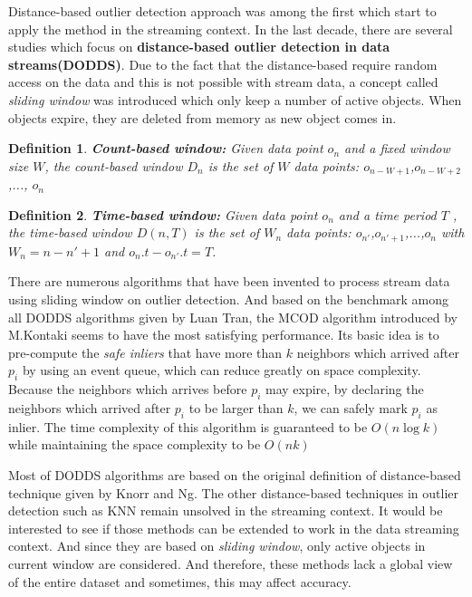 \documentclass[11pt]{article}       %
\newtheorem{definition}{Definition}
\begin{document}
Distance-based outlier detection approach was among the first which start to apply the method in the streaming context. In the last decade, there are several studies which focus on \textbf{distance-based outlier detection in data streams(DODDS)}. Due to the fact that the distance-based require random access on the data and this is not possible with stream data, a concept called \textit{sliding window} was introduced which only keep a number of active objects. When objects expire, they are deleted from memory as new object comes in.  

\begin{definition}
 \textbf{Count-based window:} Given data point $o_{n}$ and a fixed window size $W$, the count-based window $D_{n}$ is the set of $W$ data points: $o_{n - W+1}$,$o_{n -W+2}$,..., $o_{n}$
\end{definition}

\begin{definition}
 \textbf{Time-based window:} Given data point $o_{n}$ and a time period $T$ , the time-based window $D(n, T)$ is the set of $W_{n}$ data points: $o_{n'}$,$o_{n'+1}$,...,$o_{n}$ with $W_{n} = n-n' +1$ and $o_{n}.t-o_{n'}.t = T$.
\end{definition}

There are numerous algorithms that have been invented to process stream data using sliding window on outlier detection. And based on the benchmark among all DODDS algorithms given by Luan Tran\cite{Tran:2016:DOD:2994509.2994526}, the MCOD algorithm introduced by M.Kontaki\cite{5767923} seems to have the most satisfying performance. Its basic idea is to pre-compute the \textit{safe inliers} that have more than $k$ neighbors which arrived after $p_{i}$ by using an event queue, which can reduce greatly on space complexity. Because the neighbors which arrives before $p_{i}$ may expire, by declaring the neighbors which arrived after $p_{i}$ to be larger than $k$, we can safely mark $p_{i}$ as inlier. The time complexity of this algorithm is guaranteed to be $O(n\log{k})$ while maintaining the space complexity to be $O(nk)$

Most of DODDS algorithms are based on the original definition of distance-based technique given by Knorr and Ng\cite{EKnorr:1998}. The other distance-based techniques in outlier detection such as KNN remain unsolved in the streaming context. It would be interested to see if those methods can be extended to work in the data streaming context. And since they are based on \textit{sliding window}, only active objects in current window are considered. And therefore, these methods lack a global view of the entire dataset and sometimes, this may affect accuracy. 
\end{document}
